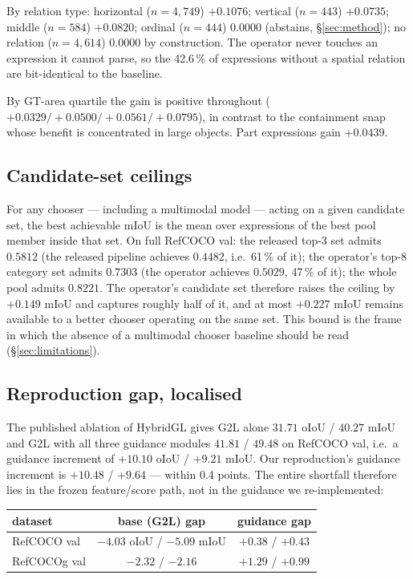 By relation type: horizontal ($n=4{,}749$) $+0.1076$; vertical ($n=443$)
$+0.0735$; middle ($n=584$) $+0.0820$; ordinal ($n=444$) $0.0000$ (abstains,
§\ref{sec:method}); no relation ($n=4{,}614$) $0.0000$ by construction. The
operator never touches an expression it cannot parse, so the 42.6\,\% of
expressions without a spatial relation are bit-identical to the baseline.

By GT-area quartile the gain is positive throughout
($+0.0329 / +0.0500 / +0.0561 / +0.0795$), in contrast to the containment snap
whose benefit is concentrated in large objects. Part expressions gain
$+0.0439$.

\subsection{Candidate-set ceilings}

For any chooser --- including a multimodal model --- acting on a given
candidate set, the best achievable mIoU is the mean over expressions of the
best pool member inside that set. On full RefCOCO val: the released top-3 set
admits $0.5812$ (the released pipeline achieves $0.4482$, i.e.\ 61\,\% of it);
the operator's top-8 category set admits $0.7303$ (the operator achieves
$0.5029$, 47\,\% of it); the whole pool admits $0.8221$. The operator's
candidate set therefore raises the ceiling by $+0.149$ mIoU and captures
roughly half of it, and at most $+0.227$ mIoU remains available to a better
chooser operating on the same set. This bound is the frame in which the absence
of a multimodal chooser baseline should be read (§\ref{sec:limitations}).

\subsection{Reproduction gap, localised}
\label{sec:repro}

The published ablation of HybridGL gives G2L alone $31.71$ oIoU / $40.27$ mIoU
and G2L with all three guidance modules $41.81$ / $49.48$ on RefCOCO val, i.e.\
a guidance increment of $+10.10$ oIoU / $+9.21$ mIoU. Our reproduction's
guidance increment is $+10.48$ / $+9.64$ --- within 0.4 points. The entire
shortfall therefore lies in the frozen feature/score path, not in the guidance
we re-implemented:

\begin{center}
\footnotesize
\begin{tabular}{lcc}
\toprule
dataset & base (G2L) gap & guidance gap \\
\midrule
RefCOCO val  & $-4.03$ oIoU / $-5.09$ mIoU & $+0.38$ / $+0.43$ \\
RefCOCOg val & $-2.32$ / $-2.16$            & $+1.29$ / $+0.99$ \\
\bottomrule
\end{tabular}
\end{center}

